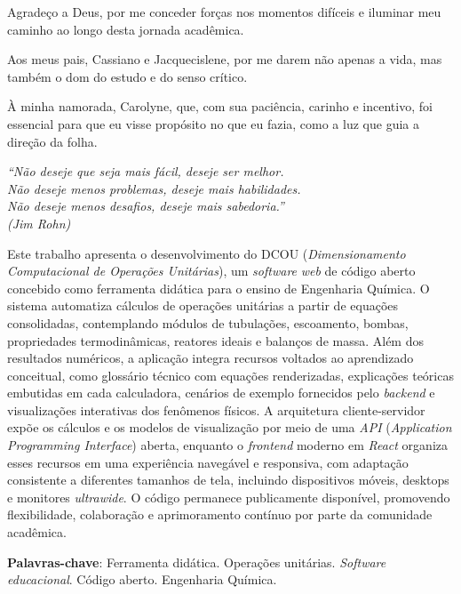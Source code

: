 \documentclass[
  12pt,        %
  openright,      %
  twoside,      %
  a4paper,      %
  english,      %
  brazil        %
  ]{abntex2}
\begin{document}

\begin{agradecimentos}
Agradeço a Deus, por me conceder forças nos momentos difíceis e iluminar meu caminho ao longo desta jornada acadêmica.

Aos meus pais, Cassiano e Jacquecislene, por me darem não apenas a vida, mas também o dom do estudo e do senso crítico.

À minha namorada, Carolyne, que, com sua paciência, carinho e incentivo, foi essencial para que eu visse propósito no que eu fazia, como a luz que guia a direção da folha.
\end{agradecimentos}

\begin{epigrafe}
    \vspace*{\fill}
  \begin{flushright}
    \textit{``Não deseje que seja mais fácil, deseje ser melhor.\\
    Não deseje menos problemas, deseje mais habilidades.\\
    Não deseje menos desafios, deseje mais sabedoria.''\\
    (Jim Rohn)}
  \end{flushright}
\end{epigrafe}


\setlength{\absparsep}{18pt} %
\begin{resumo}
Este trabalho apresenta o desenvolvimento do DCOU (\textit{Dimensionamento Computacional de Operações Unitárias}), um \textit{software} \textit{web} de código aberto concebido como ferramenta didática para o ensino de Engenharia Química. O sistema automatiza cálculos de operações unitárias a partir de equações consolidadas, contemplando módulos de tubulações, escoamento, bombas, propriedades termodinâmicas, reatores ideais e balanços de massa. Além dos resultados numéricos, a aplicação integra recursos voltados ao aprendizado conceitual, como glossário técnico com equações renderizadas, explicações teóricas embutidas em cada calculadora, cenários de exemplo fornecidos pelo \textit{backend} e visualizações interativas dos fenômenos físicos. A arquitetura cliente-servidor expõe os cálculos e os modelos de visualização por meio de uma \textit{API} (\textit{Application Programming Interface}) aberta, enquanto o \textit{frontend} moderno em \textit{React} organiza esses recursos em uma experiência navegável e responsiva, com adaptação consistente a diferentes tamanhos de tela, incluindo dispositivos móveis, desktops e monitores \textit{ultrawide}. O código permanece publicamente disponível, promovendo flexibilidade, colaboração e aprimoramento contínuo por parte da comunidade acadêmica.

 \textbf{Palavras-chave}: Ferramenta didática. Operações unitárias. \textit{Software educacional}. Código aberto. Engenharia Química.
\end{resumo}
\end{document}
